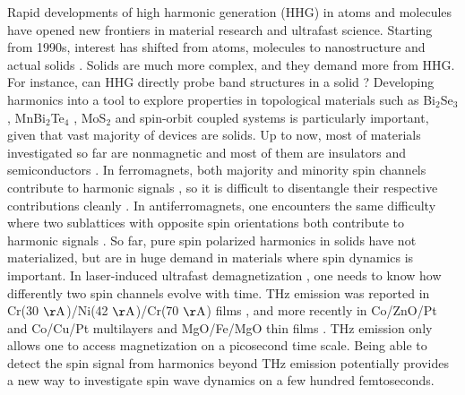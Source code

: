 \documentclass[checkin,showpacs,psfig,aps,pra]{revtex4}
\newcommand{\clr}{}
\begin{document}
Rapid developments of high harmonic generation (HHG) in atoms and
molecules \cite{mcpherson1987,ferray1988} have opened new frontiers in
material research and ultrafast science.  Starting from 1990s,
interest has shifted from atoms, molecules to nanostructure and actual
solids
\cite{farkas1992,vonderlinde1995,prl05,ganeev2009a,ghimire2011,luu2015,garg2016,nd}.
     {\clr Solids are much more complex, and they demand more from
       HHG. For instance, can HHG directly probe band structures in a
       solid \cite{vampa2015a,vampa2015b,prb20}?}  Developing harmonics
       into a tool to explore properties in topological materials such
       as Bi$_2$Se$_3$ \cite{jia2019,baykusheva2021}, MnBi$_2$Te$_4$
       \cite{jia2020b}, MoS$_2$ \cite{jia2020a} and spin-orbit coupled
       systems \cite{lysne2020} is particularly important, given that
       vast majority of devices are solids.  Up to now, most of
     materials investigated so far are nonmagnetic and most of them
     are insulators and semiconductors
     \cite{ghimire2011,garg2016,you2017}.  In ferromagnets, both
     majority and minority spin channels contribute to harmonic
     signals \cite{nc18}, so it is difficult to disentangle their
     respective contributions cleanly \cite{takayoshi2019}.  In
     antiferromagnets, one encounters the same difficulty where two
     sublattices with opposite spin orientations both contribute to
     harmonic signals \cite{Tancogne-Dejean2018}. So far, pure spin
     polarized harmonics in solids have not materialized, but are in
     huge demand in materials where spin dynamics is important. In
     laser-induced ultrafast demagnetization \cite{eric,ourreview},
     one needs to know how differently two spin channels evolve with
     time.  THz emission was reported in Cr(30 $\rm\AA$)/Ni(42
     $\rm\AA$)/Cr(70 $\rm \AA$) films \cite{eric2004}, and more
     recently in Co/ZnO/Pt and Co/Cu/Pt multilayers \cite{li2018} and
     MgO/Fe/MgO thin films \cite{zhang2020}. THz emission only allows
     one to access magnetization on a picosecond time scale.  Being
     able to detect the spin signal from harmonics beyond THz emission
     potentially provides a new way to investigate spin wave dynamics
     \cite{zhang2002,muller2009} on a few hundred femtoseconds.
\end{document}
